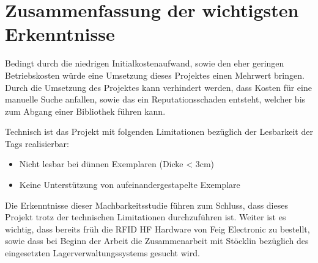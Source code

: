 \chapter{Zusammenfassung der wichtigsten Erkenntnisse}
Bedingt durch die niedrigen Initialkostenaufwand, sowie den eher geringen Betriebskosten würde eine Umsetzung dieses Projektes einen Mehrwert bringen.
Durch die Umsetzung des Projektes kann verhindert werden, dass Kosten für eine manuelle Suche anfallen, sowie das ein Reputationsschaden entsteht, welcher bis zum Abgang einer Bibliothek führen kann.

\vspace{2em}

\noindent

Technisch ist das Projekt mit folgenden Limitationen bezüglich der Lesbarkeit der Tags realisierbar:
\begin{itemize}
	\item Nicht lesbar bei dünnen Exemplaren (Dicke < 3cm)
	\item Keine Unterstützung von aufeinandergestapelte Exemplare
\end{itemize}

\vspace{2em}

\noindent
Die Erkenntnisse dieser Machbarkeitsstudie führen zum Schluss, dass dieses Projekt trotz der technischen Limitationen durchzuführen ist.
Weiter ist es wichtig, dass bereits früh die RFID HF Hardware von Feig Electronic zu bestellt, sowie dass bei Beginn der Arbeit die Zusammenarbeit mit Stöcklin bezüglich des eingesetzten Lagerverwaltungssystems gesucht wird.

